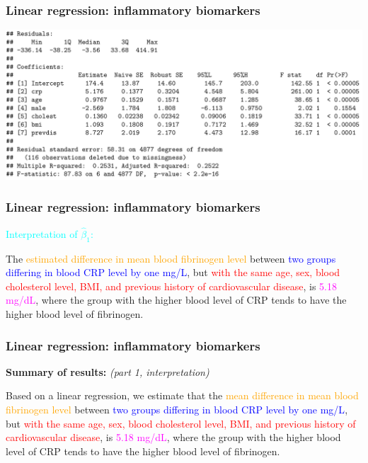 \documentclass[12pt, 
hyperref={colorlinks=true, linkcolor=blue, urlcolor=cyan},dvipsnames]{beamer}
\begin{document}
\begin{frame}
\frametitle{Linear regression: inflammatory biomarkers}
\hspace*{-0.5cm}\includegraphics[width = 1.1\textwidth]{plots/inflamm_fib_vs_crp_hidden.png} %
\end{frame}

\begin{frame}
\frametitle{Linear regression: inflammatory biomarkers}\textcolor{cyan}{Interpretation of $\hat{\beta}_1$:} 

The \textcolor{orange}{estimated difference in mean blood fibrinogen level} between \textcolor{blue}{two groups differing in blood CRP level by one mg/L}, but \textcolor{red}{with the same age, sex, blood cholesterol level, BMI, and previous history of cardiovascular disease}, is \textcolor{magenta}{5.18 mg/dL}, where the group with the higher blood level of CRP tends to have the higher blood level of fibrinogen.
\end{frame}

\begin{frame}
\frametitle{Linear regression: inflammatory biomarkers}

\textbf{Summary of results:} \textit{(part 1, interpretation)}

Based on a linear regression, we estimate that the \textcolor{orange}{mean difference in mean blood fibrinogen level} between \textcolor{blue}{two groups differing in blood CRP level by one mg/L}, but \textcolor{red}{with the same age, sex, blood cholesterol level, BMI, and previous history of cardiovascular disease}, is \textcolor{magenta}{5.18 mg/dL}, where the group with the higher blood level of CRP tends to have the higher blood level of fibrinogen. 
\end{frame}
\end{document}
